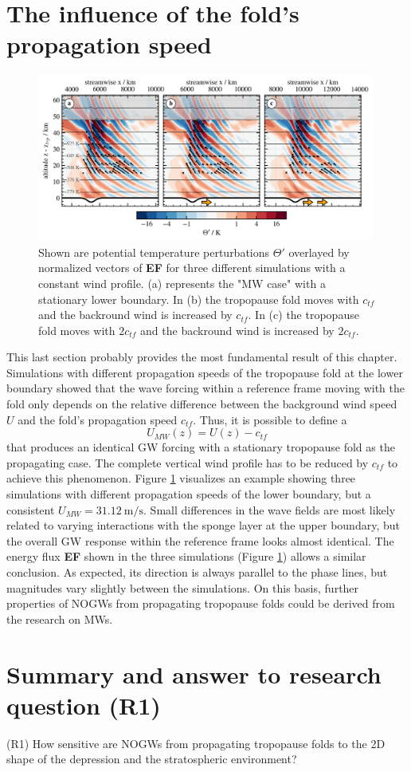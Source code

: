 \section{The influence of the fold's propagation speed}
\begin{figure}[tbp]
    \centering
    \includegraphics[width=0.99\textwidth]{figures_q3D/Q3D-TH-EF-ctropo.png}
    \caption{Shown are potential temperature perturbations $\Theta'$ overlayed by normalized vectors of \textbf{EF} for three different simulations with a constant wind profile. (a) represents the "MW case" with a stationary lower boundary. In (b) the tropopause fold moves with $c_{tf}$ and the backround wind is increased by $c_{tf}$. In (c) the tropopause fold moves with $2c_{tf}$ and the backround wind is increased by $2c_{tf}$.}
    \label{fig:q3D_ctropo}
\end{figure}
This last section probably provides the most fundamental result of this chapter. Simulations with different propagation speeds of the tropopause fold at the lower boundary showed that the wave forcing within a reference frame moving with the fold only depends on the relative difference between the background wind speed $U$ and the fold's propagation speed $c_{tf}$. Thus, it is possible to define a 
\begin{equation}
    U_{MW}(z) = U(z)-c_{tf}
\end{equation}
that produces an identical GW forcing with a stationary tropopause fold as the propagating case. The complete vertical wind profile has to be reduced by $c_{tf}$ to achieve this phenomenon. Figure \ref{fig:q3D_ctropo} visualizes an example showing three simulations with different propagation speeds of the lower boundary, but a consistent $U_{MW}=\SI{31.12}{\meter\per\second}$. Small differences in the wave fields are most likely related to varying interactions with the sponge layer at the upper boundary, but the overall GW response within the reference frame looks almost identical. The energy flux \textbf{EF} shown in the three simulations (Figure \ref{fig:q3D_ctropo}) allows a similar conclusion. As expected, its direction is always parallel to the phase lines, but magnitudes vary slightly between the simulations. On this basis, further properties of NOGWs from propagating tropopause folds could be derived from the research on MWs.

\section{Summary and answer to research question (R1)}

\begin{tcolorbox}[]
    (R1) How sensitive are NOGWs from propagating tropopause folds to the 2D shape of the depression and the stratospheric environment?
\end{tcolorbox}